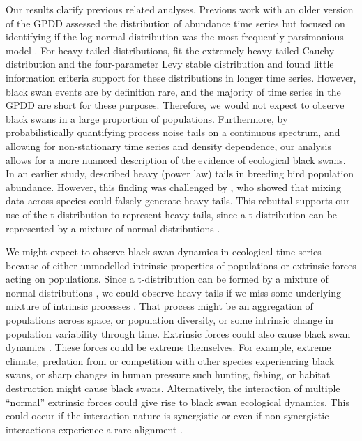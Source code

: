 Our results clarify previous related analyses. Previous work with an older
version of the GPDD assessed the distribution of abundance time series but
focused on identifying if the log-normal distribution was the most frequently
parsimonious model \citep{halley2002}. For heavy-tailed distributions,
\citet{halley2002} fit the extremely heavy-tailed Cauchy distribution and the
four-parameter Levy stable distribution and found little information criteria
support for these distributions in longer time series. However, black swan
events are by definition rare, and the majority of time series in the GPDD are
short for these purposes. Therefore, we would not expect to observe black swans
in a large proportion of populations. Furthermore, by probabilistically
quantifying process noise tails on a continuous spectrum, and allowing for
non-stationary time series and density dependence, our analysis allows for
a more nuanced description of the evidence of ecological black swans. In an
earlier study, \citet{keitt1998} described heavy (power law) tails in breeding
bird population abundance. However, this finding was challenged by
\citet{allen2001}, who showed that mixing data across species could
falsely generate heavy tails. This rebuttal supports our use of the
t distribution to represent heavy tails, since a t distribution can be
represented by a mixture of normal distributions \citep[with the same mean and
inverse-gamma-distributed variances,][]{gelman2014}.

We might expect to observe black swan dynamics in ecological time series
because of either unmodelled intrinsic properties of populations or extrinsic
forces acting on populations. Since a t-distribution can be formed by a mixture
of normal distributions \citep{gelman2014}, we could observe heavy tails if we
miss some underlying mixture of intrinsic processes \citep{allen2001}. That
process might be an aggregation of populations across space, or population
diversity, or some intrinsic change in population variability through time.
Extrinsic forces could also cause black swan dynamics
\citep[e.g.][]{nunez2012}. These forces could be extreme themselves. For
example, extreme climate, predation from or competition with other species
experiencing black swans, or sharp changes in human pressure such hunting,
fishing, or habitat destruction might cause black swans. Alternatively, the
interaction of multiple ``normal'' extrinsic forces could give rise to black
swan ecological dynamics. This could occur if the interaction nature is
synergistic \citep[e.g.][]{kirby2009} or even if non-synergistic interactions
experience a rare alignment \citep{denny2009}.

